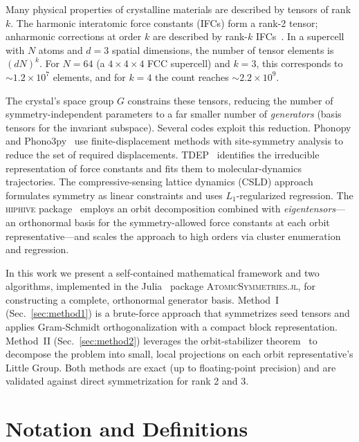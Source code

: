 \documentclass[twocolumn,amsmath,amssymb,aps,prb,10pt,floatfix]{revtex4-2}
\begin{document}
Many physical properties of crystalline materials are described by tensors of rank $k$.
The harmonic interatomic force constants (IFCs) form a rank-2 tensor; anharmonic corrections at order $k$ are described by rank-$k$ IFCs~\cite{BornHuang1954,Leibfried1961}.
In a supercell with $N$ atoms and $d=3$ spatial dimensions, the number of tensor elements is $(dN)^k$.
For $N=64$ (a $4\times4\times4$ FCC supercell) and $k=3$, this corresponds to $\sim 1.2 \times 10^7$ elements, and for $k=4$ the count reaches $\sim 2.2 \times 10^9$.

The crystal's space group $G$ constrains these tensors, reducing the number of symmetry-independent parameters to a far smaller number of \emph{generators} (basis tensors for the invariant subspace).
Several codes exploit this reduction.
Phonopy and Phono3py~\cite{Togo2015phonopy,Togo2023phonopy,Togo2015phono3py,Togo2023implementation} use finite-displacement methods with site-symmetry analysis to reduce the set of required displacements.
TDEP~\cite{Hellman2011,Hellman2013,Hellman2013cubic,Knoop2024tdep} identifies the irreducible representation of force constants and fits them to molecular-dynamics trajectories.
The compressive-sensing lattice dynamics (CSLD) approach~\cite{Zhou2019csld} formulates symmetry as linear constraints and uses $L_1$-regularized regression.
The \textsc{hiphive} package~\cite{Eriksson2019,Fransson2020} employs an orbit decomposition combined with \emph{eigentensors}---an orthonormal basis for the symmetry-allowed force constants at each orbit representative---and scales the approach to high orders via cluster enumeration and regression.

In this work we present a self-contained mathematical framework and two algorithms, implemented in the Julia~\cite{Bezanson2017julia} package \textsc{AtomicSymmetries.jl}, for constructing a complete, orthonormal generator basis.
Method~I (Sec.~\ref{sec:method1}) is a brute-force approach that symmetrizes seed tensors and applies Gram-Schmidt orthogonalization with a compact block representation.
Method~II (Sec.~\ref{sec:method2}) leverages the orbit-stabilizer theorem~\cite{Serre1977} to decompose the problem into small, local projections on each orbit representative's Little Group.
Both methods are exact (up to floating-point precision) and are validated against direct symmetrization for rank 2 and 3.


\section{Notation and Definitions}
\label{sec:notation}
\end{document}
